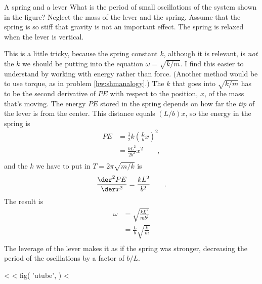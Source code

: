         \begin{eg}{A spring and a lever}\label{eg:leverspring}
        \egquestion
        What is the period of small oscillations of the system shown in the figure?
        Neglect the mass of the lever and the spring. Assume that the spring is
        so stiff that gravity is not an important effect. The spring is relaxed
        when the lever is vertical.
        
        \eganswer
        This is a little tricky, because the spring constant $k$, although it
        is relevant, is \emph{not} the $k$ we should be putting into the equation
        $\omega=\sqrt{k/m}$.
        I find this easier to understand by working with energy rather than force.
        (Another method would be to use torque, as in problem \ref{hw:shmanalogy}.)
        The $k$ that goes into $\sqrt{k/m}$ has to be the second
        derivative of $PE$ with respect to the position, $x$, of the mass that's
        moving. The energy $PE$ stored in the spring depends on how far the
        \emph{tip} of the lever is from the center. This distance equals
        $(L/b)x$, so the energy in the spring is
        \begin{align*}
                PE        &= \frac{1}{2}k\left(\frac{L}{b}x\right)^2 \\
                        &= \frac{kL^2}{2b^2}x^2 \qquad , \\
        \end{align*}
        and the $k$ we have to put in $T=2\pi\sqrt{m/k}$ is
        \begin{equation*}
                \frac{\der^2 PE}{\der x^2}        =  \frac{kL^2}{b^2} \qquad . \\
        \end{equation*}
        The result is
        \begin{align*}
                \omega  &=  \sqrt{\frac{kL^2}{mb^2}} \\
                        &=  \frac{L}{b}\sqrt{\frac{k}{m}} \\
        \end{align*}
        The leverage of the lever makes it as if the spring was stronger,
        decreasing the period of the oscillations by a factor of $b/L$.
        \end{eg}
<%
<%
  fig(
    'utube',
  )
<%

